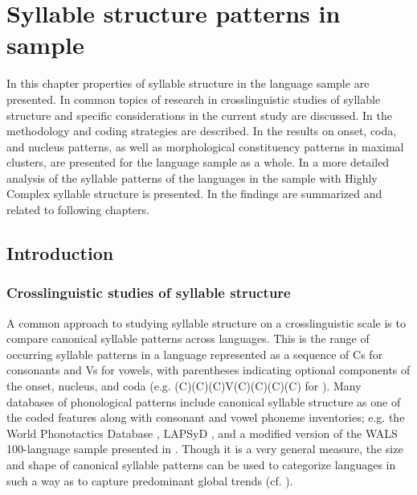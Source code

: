\chapter{Syllable structure patterns in sample}\label{sec:3}

  In this chapter properties of syllable structure in the language sample are presented. In  common topics of research in crosslinguistic studies of syllable structure and specific considerations in the current study are discussed. In  the methodology and coding strategies are described. In  the results on onset, coda, and nucleus patterns, as well as morphological constituency patterns in maximal clusters, are presented for the language sample as a whole. In  a more detailed analysis of the syllable patterns of the languages in the sample with Highly Complex syllable structure is presented. In  the findings are summarized and related to following chapters.

\section{Introduction}\label{sec:3.1}
\subsection{Crosslinguistic studies of syllable structure}\label{sec:3.1.1}

  A common approach to studying syllable structure on a crosslinguistic scale is to compare canonical syllable patterns across languages. This is the range of occurring syllable patterns in a language represented as a sequence of Cs for consonants and Vs for vowels, with parentheses indicating optional components of the onset, nucleus, and coda (e.g. (C)(C)(C)V(C)(C)(C)(C) for ). Many databases of phonological patterns include canonical syllable structure as one of the coded features along with consonant and vowel phoneme inventories; e.g.  the World Phonotactics Database \citep{DonohueEtAl2013}, LAPSyD \citep{MaddiesonEtAl2013}, and a modified version of the WALS 100-language sample presented in \citet{Gordon2016}. Though it is a very general measure, the size and shape of canonical syllable patterns can be used to categorize languages in such a way as to capture predominant global trends (cf. \citealt{Maddieson2013a}).

